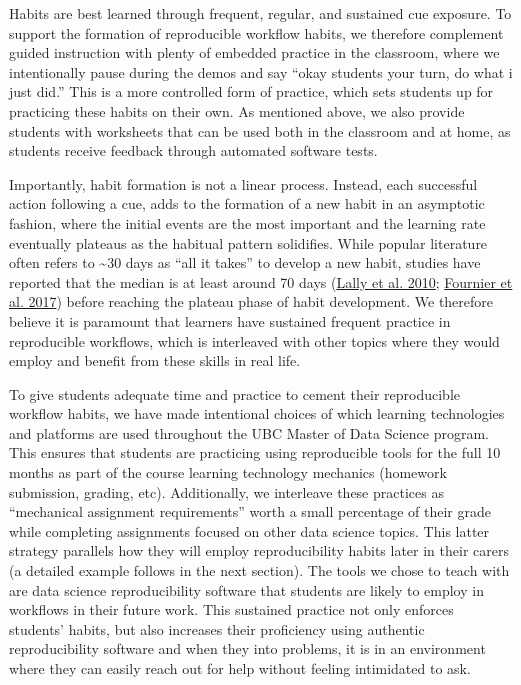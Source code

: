 \documentclass{article}
\begin{document}
Habits are best learned through frequent, regular, and sustained cue
exposure. To support the formation of reproducible workflow habits, we
therefore complement guided instruction with plenty of embedded practice
in the classroom, where we intentionally pause during the demos and say
``okay students your turn, do what i just did.'' This is a more
controlled form of practice, which sets students up for practicing these
habits on their own. As mentioned above, we also provide students with
worksheets that can be used both in the classroom and at home, as
students receive feedback through automated software tests.

Importantly, habit formation is not a linear process. Instead, each
successful action following a cue, adds to the formation of a new habit
in an asymptotic fashion, where the initial events are the most
important and the learning rate eventually plateaus as the habitual
pattern solidifies. While popular literature often refers to
\textasciitilde30 days as ``all it takes'' to develop a new habit,
studies have reported that the median is at least around 70 days
(\protect\hyperlink{ref-wardle_lally_2010}{Lally et al. 2010};
\protect\hyperlink{ref-radel_fournier_2017}{Fournier et al. 2017})
before reaching the plateau phase of habit development. We therefore
believe it is paramount that learners have sustained frequent practice
in reproducible workflows, which is interleaved with other topics where
they would employ and benefit from these skills in real life.

To give students adequate time and practice to cement their reproducible
workflow habits, we have made intentional choices of which learning
technologies and platforms are used throughout the UBC Master of Data
Science program. This ensures that students are practicing using
reproducible tools for the full 10 months as part of the course learning
technology mechanics (homework submission, grading, etc). Additionally,
we interleave these practices as ``mechanical assignment requirements''
worth a small percentage of their grade while completing assignments
focused on other data science topics. This latter strategy parallels how
they will employ reproducibility habits later in their carers (a
detailed example follows in the next section). The tools we chose to
teach with are data science reproducibility software that students are
likely to employ in workflows in their future work. This sustained
practice not only enforces students' habits, but also increases their
proficiency using authentic reproducibility software and when they into
problems, it is in an environment where they can easily reach out for
help without feeling intimidated to ask.
\end{document}
